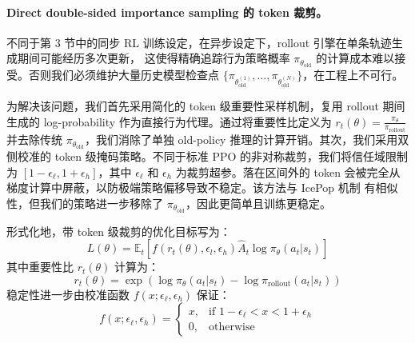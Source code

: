 \paragraph{Direct
double-sided importance sampling 的 token 裁剪。}
不同于第 3 节中的同步 RL 训练设定，在异步设定下，rollout 引擎在单条轨迹生成期间可能经历多次更新，
这使得精确追踪行为策略概率 $\pi_{\theta_{\text{old}}}$ 的计算成本难以接受。否则我们必须维护大量历史模型检查点 $\{\pi_{\theta_{\text{old}}^{(1)}}, \dots, \pi_{\theta_{\text{old}}^{(N)}}\}$，在工程上不可行。

为解决该问题，我们首先采用简化的 token 级重要性采样机制，复用 rollout 期间生成的 log-probability 作为直接行为代理。通过将重要性比定义为 $r_t(\theta) = \frac{\pi_{\theta}}{\pi_{\text{rollout}}}$ 并去除传统 $\pi_{\theta_{\text{old}}}$，我们消除了单独 old-policy 推理的计算开销。其次，我们采用双侧校准的 token 级掩码策略。不同于标准 PPO 的非对称裁剪，我们将信任域限制为 $[1-\epsilon_\ell, 1+\epsilon_h]$，其中 $\epsilon_\ell$ 和 $\epsilon_h$ 为裁剪超参。落在区间外的 token 会被完全从梯度计算中屏蔽，以防极端策略偏移导致不稳定。该方法与 IcePop 机制 \cite{team2025every} 有相似性，但我们的策略进一步移除了 $\pi_{\theta_{\text{old}}}$，因此更简单且训练更稳定。

形式化地，带 token 级裁剪的优化目标写为：
\begin{equation}
    L(\theta) = \mathbb{E}_t \left[ f(r_t(\theta), \epsilon_l, \epsilon_h) \hat{A}_t \log \pi_{\theta}(a_t|s_t) \right]
\end{equation}
其中重要性比 $r_t(\theta)$ 计算为：
\begin{equation}
    r_t(\theta) = \exp\left( \log \pi_\theta(a_t|s_t) - \log \pi_{\text{rollout}}(a_t|s_t) \right)
\end{equation}
稳定性进一步由校准函数 $f(x; \epsilon_\ell, \epsilon_h)$ 保证：
\begin{equation}
    f(x; \epsilon_\ell, \epsilon_h) = 
    \begin{cases} 
    x, & \text{if } 1-\epsilon_\ell < x < 1+\epsilon_h \\
    0, & \text{otherwise}
    \end{cases}
\end{equation}

